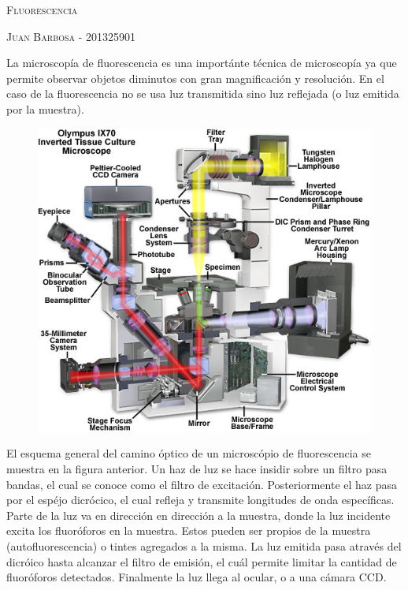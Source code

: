 \documentclass[addpoints,12pt]{exam}
\begin{document}
	\begin{center}
		\LARGE\scshape{Fluorescencia}
		
		\vspace{1cm}
		\large\scshape{Juan Barbosa - 201325901}
	\end{center}

	La microscop\'ia de fluorescencia es una importánte técnica de microscop\'ia ya que permite observar objetos diminutos con gran magnificación y resolución. En el caso de la fluorescencia no se usa luz transmitida sino luz reflejada (o luz emitida por la muestra).
	
	\begin{figure}[h]
		\centering
		\includegraphics[width = 0.5\linewidth]{lightpaths.jpg}
	\end{figure}
	
	El esquema general del camino óptico de un microscópio de fluorescencia se muestra en la figura anterior. Un haz de luz se hace insidir sobre un filtro pasa bandas, el cual se conoce como el filtro de excitación. Posteriormente el haz pasa por el espéjo dicrócico, el cual refleja y transmite longitudes de onda específicas. Parte de la luz va en dirección en direcci\'on a la muestra, donde la luz incidente excita los fluor\'oforos en la muestra. Estos pueden ser propios de la muestra (autofluorescencia) o tintes agregados a la misma. La luz emitida pasa atrav\'es del dicr\'oico hasta alcanzar el filtro de emisi\'on, el cu\'al permite limitar la cantidad de fluor\'oforos detectados. Finalmente la luz llega al ocular, o a una c\'amara CCD.
	
\end{document}
